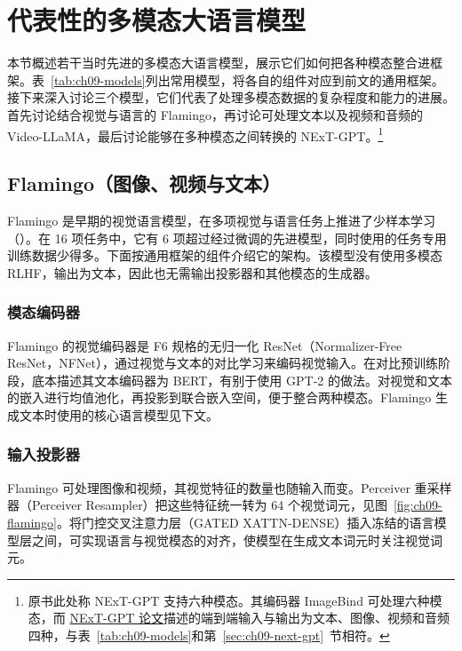 \section{代表性的多模态大语言模型}
\label{sec:ch09-models}
本节概述若干当时先进的多模态大语言模型，展示它们如何把各种模态整合进框架。表~\ref{tab:ch09-models}列出常用模型，将各自的组件对应到前文的通用框架。接下来深入讨论三个模型，它们代表了处理多模态数据的复杂程度和能力的进展。首先讨论结合视觉与语言的 Flamingo，再讨论可处理文本以及视频和音频的 Video-LLaMA，最后讨论能够在多种模态之间转换的 NExT-GPT。\footnote{原书此处称 NExT-GPT 支持六种模态。其编码器 ImageBind 可处理六种模态，而 \href{https://arxiv.org/abs/2309.05519}{NExT-GPT 论文}描述的端到端输入与输出为文本、图像、视频和音频四种，与表~\ref{tab:ch09-models}和第~\ref{sec:ch09-next-gpt}~节相符。}



\subsection{Flamingo（图像、视频与文本）}
Flamingo 是早期的视觉语言模型，在多项视觉与语言任务上推进了少样本学习（）。在 16 项任务中，它有 6 项超过经过微调的先进模型，同时使用的任务专用训练数据少得多。下面按通用框架的组件介绍它的架构。该模型没有使用多模态 RLHF，输出为文本，因此也无需输出投影器和其他模态的生成器。


\subsubsection{模态编码器}
Flamingo 的视觉编码器是 F6 规格的无归一化 ResNet（Normalizer-Free ResNet，NFNet），通过视觉与文本的对比学习来编码视觉输入。在对比预训练阶段，底本描述其文本编码器为 BERT，有别于使用 GPT-2 的做法。对视觉和文本的嵌入进行均值池化，再投影到联合嵌入空间，便于整合两种模态。Flamingo 生成文本时使用的核心语言模型见下文。

\subsubsection{输入投影器}
Flamingo 可处理图像和视频，其视觉特征的数量也随输入而变。Perceiver 重采样器（Perceiver Resampler）把这些特征统一转为 64 个视觉词元，见图~\ref{fig:ch09-flamingo}。将门控交叉注意力层（GATED XATTN-DENSE）插入冻结的语言模型层之间，可实现语言与视觉模态的对齐，使模型在生成文本词元时关注视觉词元。


